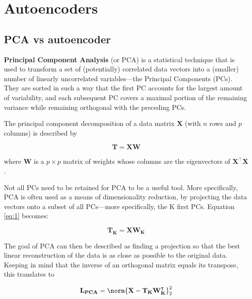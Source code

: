 

\section{Autoencoders}
\label{sec:auto}





\subsection{PCA vs autoencoder}

\textbf{Principal Component Analysis} (or PCA) is a statistical technique that is used to transform a set of (potentially) correlated data vectors into a (smaller) number of linearly uncorrelated variables---the Principal Components (PCs). They are sorted in such a way that the first PC accounts for the largest amount of variability, and each subsequent PC covers a maximal portion of the remaining variance while remaining orthogonal with the preceding PCs.

The principal component decomposition of a data matrix $\mathbf{X}$ (with $n$ rows and $p$ columns) is described by

\begin{equation} \label{eq:1}
	\mathbf{T} = \mathbf{XW}
\end{equation}

where $\mathbf{W}$ is a $p \times p$ matrix of weights whose columns are the eigenvectors of $\mathbf{X^ \intercal X}$. 

Not all PCs need to be retained for PCA to be a useful tool. More specifically, PCA is often used as a means of dimensionality reduction, by projecting the data vectors onto a subset of all PCs---more specifically, the K first PCs. Equation \ref{eq:1} becomes:

\begin{equation} \label{eq:2}
	\mathbf{T_K} = \mathbf{XW_K}
\end{equation}

The goal of PCA can then be described as finding a projection so that the best linear reconstruction of the data is as close as possible to the original data. Keeping in mind that the inverse of an orthogonal matrix equals its transpose, this translates to

\begin{equation} \label{eq:3}
	\mathbf{L_{PCA}} = \norm{\mathbf{X} - \mathbf{T_K W ^\intercal_K  }}_2^2
\end{equation}

